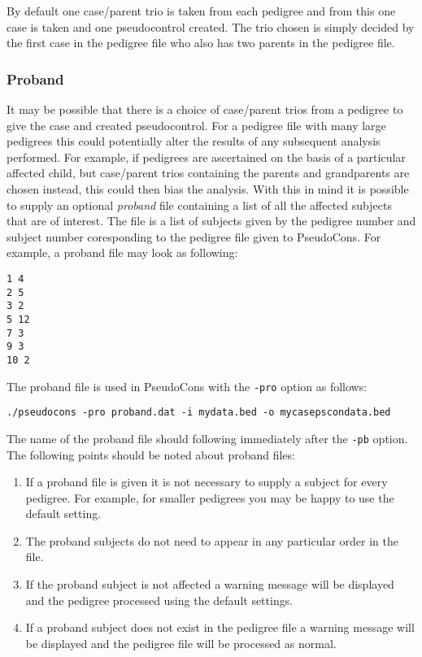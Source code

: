 \documentclass[a4paper,12pt]{article}
\newcommand{\code}[1]{{\footnotesize{{\tt #1}}}}
\begin{document}
By default one case/parent trio is taken from each pedigree and from this one case is taken and one pseudocontrol created. The trio chosen is simply decided by the first case in the pedigree file who also has two parents in the pedigree file. 
\subsubsection{Proband}
\label{proband}

It may be possible that there is a choice of case/parent trios from a pedigree to give the case and created pseudocontrol. For a pedigree file with many large pedigrees this could potentially alter the results of any subsequent analysis performed. For example, if pedigrees are ascertained on the basis of a particular affected child, but case/parent trios containing the parents and grandparents are chosen instead, this could then bias the analysis. With this in mind it is possible to supply an optional {\it proband} file containing a list of all the affected subjects that are of interest. The file is a list of subjects given by the pedigree number and subject number coresponding to the pedigree file given to PseudoCons. For example, a proband file may look as following: 
\begin{verbatim}
1 4
2 5
3 2
5 12
7 3
9 3
10 2
\end{verbatim}

The proband file is used in PseudoCons with the \code{-pro} option as follows: 
\begin{verbatim}
./pseudocons -pro proband.dat -i mydata.bed -o mycasepscondata.bed
\end{verbatim}

The name of the proband file should following immediately after the \code{-pb} option. The following points should be noted about proband files: 
\begin{enumerate}

\item If a proband file is given it is not necessary to supply a subject for every pedigree. For example, for smaller pedigrees you may be happy to use the default setting. 
\item The proband subjects do not need to appear in any particular order in the file. 
\item If the proband subject is not affected a warning message will be displayed and the pedigree processed using the default settings. 
\item If a proband subject does not exist in the pedigree file a warning message will be displayed and the pedigree file will be processed as normal.\end{enumerate}
\end{document}
